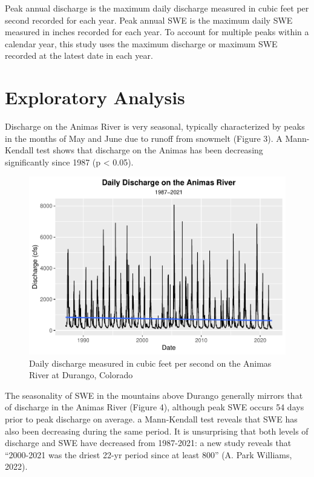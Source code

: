 \documentclass[
  12pt,
]{article}
\begin{document}
Peak annual discharge is the maximum daily discharge measured in cubic
feet per second recorded for each year. Peak annual SWE is the maximum
daily SWE measured in inches recorded for each year. To account for
multiple peaks within a calendar year, this study uses the maximum
discharge or maximum SWE recorded at the latest date in each year.

\newpage

\hypertarget{exploratory-analysis}{%
\section{Exploratory Analysis}\label{exploratory-analysis}}

Discharge on the Animas River is very seasonal, typically characterized
by peaks in the months of May and June due to runoff from snowmelt
(Figure 3). A Mann-Kendall test shows that discharge on the Animas has
been decreasing significantly since 1987 (p \textless{} 0.05).

\begin{figure}
\centering
\includegraphics{McLaughlin_WDA_Project_files/figure-latex/unnamed-chunk-2-1.pdf}
\caption{Daily discharge measured in cubic feet per second on the Animas
River at Durango, Colorado}
\end{figure}

\newpage

The seasonality of SWE in the mountains above Durango generally mirrors
that of discharge in the Animas River (Figure 4), although peak SWE
occurs 54 days prior to peak discharge on average. a Mann-Kendall test
reveals that SWE has also been decreasing during the same period. It is
unsurprising that both levels of discharge and SWE have decreased from
1987-2021: a new study reveals that ``2000-2021 was the driest 22-yr
period since at least 800'' (A. Park Williams, 2022).
\end{document}

